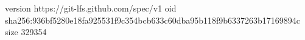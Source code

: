 version https://git-lfs.github.com/spec/v1
oid sha256:936bf5280e18fa925531f9c354bcb633c60dba95b118f9b6337263b17169894c
size 329354
